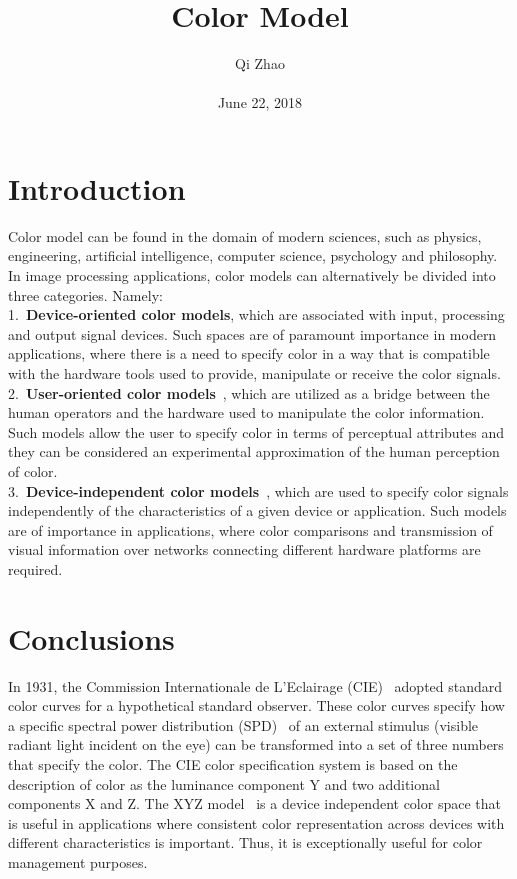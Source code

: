 \documentclass[10pt,twocolumn,letterpaper]{article}
\begin{document}
\title{Color Model}
\author{Qi Zhao\\\\June 22, 2018}

\maketitle
\section{Introduction}
Color model can be found in the domain of modern sciences, such as physics, engineering, artificial intelligence, computer science, psychology and philosophy. In image processing applications, color models can alternatively be divided into three categories. Namely:\\
1.~\textbf{Device-oriented color models}, which are associated with input, processing and output signal devices. Such spaces are of paramount importance in modern applications, where there is a need to specify color in a way that is compatible with the hardware tools used to provide, manipulate or receive the color signals.\\
2.~\textbf{User-oriented color models}~\cite{Hu2015A}, which are utilized as a bridge between the human operators and the hardware used to manipulate the color information. Such models allow the user to specify color in terms of perceptual attributes and they can be considered an experimental approximation of the human perception of color.\\
3.~\textbf{Device-independent color models}~\cite{Fairchild2010Considering}, which are used to specify color signals independently of the characteristics of a given device or application. Such models are of importance in applications, where color comparisons and transmission of visual information over networks connecting different hardware platforms are required.

\section{Conclusions}

In 1931, the Commission Internationale de L'Eclairage (CIE)~\cite{Robertson1977The} adopted standard color curves for a hypothetical standard observer. These color curves specify how a specific spectral power distribution (SPD)~\cite{Boyce2003The} of an external stimulus (visible radiant light incident on the eye) can be transformed into a set of three numbers that specify the color. The CIE color specification system is based on the description of color as the luminance component Y and two additional components X and Z. The XYZ model~\cite{GUSTAVO2008THERMAL} is a device independent color space that is useful in applications where consistent color representation across devices with different characteristics is important. Thus, it is exceptionally useful for color management purposes.
{\small


}
\end{document}
